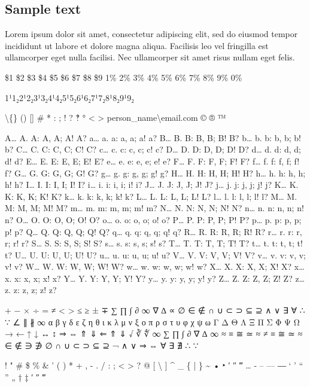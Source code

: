 \begin{raggedright}
\section*{Sample text}
Lorem ipsum dolor sit amet, consectetur adipiscing elit, sed do eiusmod tempor incididunt ut labore et dolore magna aliqua. Facilisis leo vel fringilla est ullamcorper eget nulla facilisi. Nec ullamcorper sit amet risus nullam eget felis.

\$1 \$2 \$3 \$4 \$5 \$6 \$7 \$8 \$9 1\% 2\% 3\% 4\% 5\% 6\% 7\% 8\% 9\% 0\%

1¹1₂2¹2₂3¹3₂4¹4₂5¹5₂6¹6₂7¹7₂8¹8₂9¹9₂

\textbackslash\{\} () [] \# * : ; ! ? ‽ ° \textless{} \textgreater{} person\_name\textbackslash{}email.com © ® ™

A… A. A: A, A; A! A? a… a. a: a, a; a! a?
B… B. B: B, B; B! B? b… b. b: b, b; b! b?
C… C. C: C, C; C! C? c… c. c: c, c; c! c?
D… D. D: D, D; D! D? d… d. d: d, d; d! d?
E… E. E: E, E; E! E? e… e. e: e, e; e! e?
F… F. F: F, F; F! F? f… f. f: f, f; f! f?
G… G. G: G, G; G! G? g… g. g: g, g; g! g?
H… H. H: H, H; H! H? h… h. h: h, h; h! h?
I… I. I: I, I; I! I? i… i. i: i, i; i! i?
J… J. J: J, J; J! J? j… j. j: j, j; j! j?
K… K. K: K, K; K! K? k… k. k: k, k; k! k?
L… L. L: L, L; L! L? l… l. l: l, l; l! l?
M… M. M: M, M; M! M? m… m. m: m, m; m! m?
N… N. N: N, N; N! N? n… n. n: n, n; n! n?
O… O. O: O, O; O! O? o… o. o: o, o; o! o?
P… P. P: P, P; P! P? p… p. p: p, p; p! p?
Q… Q. Q: Q, Q; Q! Q? q… q. q: q, q; q! q?
R… R. R: R, R; R! R? r… r. r: r, r; r! r?
S… S. S: S, S; S! S? s… s. s: s, s; s! s?
T… T. T: T, T; T! T? t… t. t: t, t; t! t?
U… U. U: U, U; U! U? u… u. u: u, u; u! u?
V… V. V: V, V; V! V? v… v. v: v, v; v! v?
W… W. W: W, W; W! W? w… w. w: w, w; w! w?
X… X. X: X, X; X! X? x… x. x: x, x; x! x?
Y… Y. Y: Y, Y; Y! Y? y… y. y: y, y; y! y?
Z… Z. Z: Z, Z; Z! Z? z… z. z: z, z; z! z?

+ − × ÷ = ≠ < > ≤ ≥ ± ∓
∑ ∏ ∫ ∂ ∞ ∇ ∆ ∝ ∅ ∈ ∉ ∩ ∪ ⊂ ⊃ ⊆ ⊇ ∧ ∨ ∃ ∀ ∴ ∵ ∠ ∥ ∦ ∞
α β γ δ ε ζ η θ ι κ λ μ ν ξ ο π ρ σ τ υ φ χ ψ ω
Γ Δ Θ Λ Ξ Π Σ Φ Ψ Ω
→ ← ↑ ↓ ↔ ↕ ⇒ ⇔ ⇑ ⇓ ⇐ ⇑ ⇓
√ ∛ ∜ ∞ ∑ ∏ ∫ ∂ ∇ ∆ ∞ ≈ ≡ ≅ ≃ ≈ ≠ ≡ ≅ ≃ ≈
∈ ∉ ∋ ∌ ∅ ∩ ∪ ⊂ ⊃ ⊆ ⊇
¬ ∧ ∨ ⇒ ⇔ ∀ ∃ ∄ ∴ ∵

! " \# \$ \% \& ' ( ) * + , - . / : ; \textless{} \textgreater{} ? @ [ \textbackslash{} ] \^{} \_ \{ | \} \~{}
• ‣ ′ ″ ‴ … ‐ – — ― ‘ ’ “ ” „ † ‡ ′ ″ ‴


\end{raggedright}

